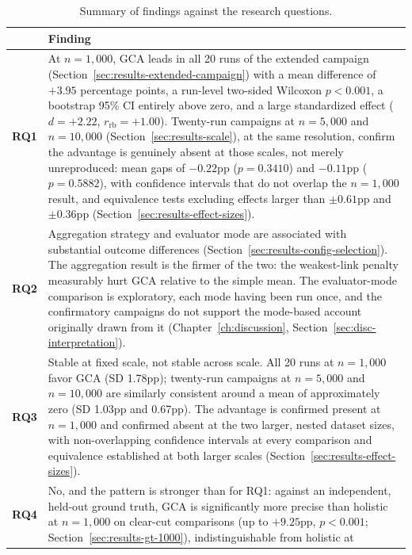 \begin{table}[htbp]
\centering
\caption[Summary of findings against the research questions]{Summary of findings against the research questions.}
\label{tab:rq-summary}
\renewcommand{\arraystretch}{1.25}
\begin{tabularx}{\textwidth}{@{}>{\bfseries}l X@{}}
\toprule
& Finding \\
\midrule
RQ1 &
  At $n=1{,}000$, GCA leads in all 20 runs of the extended campaign
  (Section~\ref{sec:results-extended-campaign}) with a mean difference of
  $+3.95$ percentage points, a run-level two-sided Wilcoxon $p<0.001$, a
  bootstrap 95\% CI entirely above zero, and a large standardized effect
  ($d=+2.22$, $r_{\text{rb}}=+1.00$). Twenty-run campaigns at $n=5{,}000$ and
  $n=10{,}000$ (Section~\ref{sec:results-scale}), at the same resolution,
  confirm the advantage is genuinely absent at those scales, not merely
  unreproduced: mean gaps of $-0.22$pp ($p=0.3410$) and $-0.11$pp
  ($p=0.5882$), with confidence intervals that do not overlap the
  $n=1{,}000$ result, and equivalence tests excluding effects larger than
  $\pm0.61$pp and $\pm0.36$pp (Section~\ref{sec:results-effect-sizes}). \\
RQ2 &
  Aggregation strategy and evaluator mode are associated with substantial
  outcome differences (Section~\ref{sec:results-config-selection}). The
  aggregation result is the firmer of the two: the weakest-link penalty
  measurably hurt GCA relative to the simple mean. The evaluator-mode
  comparison is exploratory, each mode having been run once, and the
  confirmatory campaigns do not support the mode-based account originally
  drawn from it (Chapter~\ref{ch:discussion}, Section~\ref{sec:disc-interpretation}). \\
RQ3 &
  Stable at fixed scale, not stable across scale. All 20 runs at $n=1{,}000$
  favor GCA (SD 1.78pp); twenty-run campaigns at $n=5{,}000$ and $n=10{,}000$
  are similarly consistent around a mean of approximately zero (SD 1.03pp and
  0.67pp). The advantage is confirmed present at $n=1{,}000$ and confirmed
  absent at the two larger, nested dataset sizes, with non-overlapping
  confidence intervals at every comparison and equivalence established at both
  larger scales (Section~\ref{sec:results-effect-sizes}). \\
RQ4 &
  No, and the pattern is stronger than for RQ1: against an independent,
  held-out ground truth, GCA is significantly more precise than holistic at
  $n=1{,}000$ on clear-cut comparisons (up to $+9.25$pp, $p<0.001$;
  Section~\ref{sec:results-gt-1000}), indistinguishable from holistic at

\end{tabularx}
\end{table}
